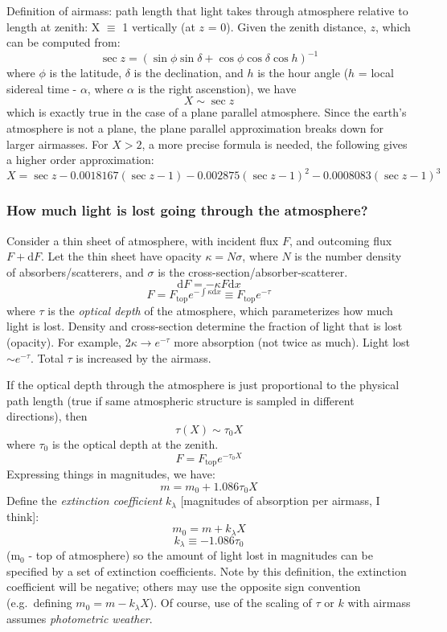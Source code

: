 \documentclass[12pt]{article}
\begin{document}
Definition of airmass: path length that light takes through atmosphere
relative to length at zenith: X $\equiv$ 1 vertically (at $z$ = 0).
Given the zenith distance, $z$, which can be computed from:
    $$ \sec z = \left(\sin\phi\sin\delta +
                 \cos\phi\cos\delta\cos h\right)^{-1} $$
where $\phi$ is the latitude, $\delta$ is the declination, and $h$ is
the hour angle ($h$ = local sidereal time - $\alpha$, where $\alpha$ is
the right ascenstion), we have
    $$ X \sim \sec z $$
which is exactly true in the case of a plane parallel atmosphere. Since
the earth's atmosphere is not a plane, the plane parallel
approximation breaks down for larger airmasses. For $X>2$, a more
precise formula is needed, the following gives a higher order
approximation:
    $$ X = \sec z - 0.0018167(\sec z-1)
                  - 0.002875(\sec z-1)^2
                  - 0.0008083(\sec z-1)^3 $$

\subsubsection*{How much light is lost going through the atmosphere?}
Consider a thin sheet of atmosphere, with incident flux $F$, and
outcoming flux $F + \textrm{d}F$.
Let the thin sheet have opacity $\kappa = N\sigma$,
where $N$ is the number density of absorbers/scatterers, and
$\sigma$ is the cross-section/absorber-scatterer.
    $$ \textrm{d}F = -\kappa F \textrm{d}x $$
    $$ F = F_{\textrm{top}}e^{-\int\kappa\textrm{d}x}
         \equiv F_{\textrm{top}}e^{-\tau} $$
where $\tau$ is the \emph{optical depth} of the atmosphere, which
parameterizes how much light is lost.
\textcolor{myBlue}{Density and cross-section determine the fraction
    of light that is lost (opacity). For example, 2$\kappa \rightarrow
    e^{-\tau}$ more absorption (not twice as much).
    Light lost $\sim e^{-\tau}$.
    Total $\tau$ is increased by the airmass.
}

If the optical depth through the atmosphere is just proportional to
the physical path length (true if same atmospheric structure is
sampled in different directions), then
    $$ \tau(X) \sim \tau_0X $$
where $\tau_0$ is the optical depth at the zenith.
    $$ F = F_{\textrm{top}}e^{-\tau_0X} $$
Expressing things in magnitudes, we have:
    $$ m = m_0 + 1.086\tau_0X $$
Define the \emph{extinction coefficient} $k_{\lambda}$ [magnitudes of
absorption per airmass, I think]:
    $$ m_0 = m + k_{\lambda}X $$
    $$ k_{\lambda} \equiv -1.086\tau_0 $$
(m$_0$ - top of atmosphere)
so the amount of light lost in magnitudes can be specified by a set of
extinction coefficients. Note by this definition, the extinction
coefficient will be negative; others may use the opposite sign
convention (e.g.\ defining $m_0 = m - k_{\lambda}X$). Of
course, use of the scaling of $\tau$ or $k$ with airmass assumes
\emph{photometric weather}.
\end{document}
